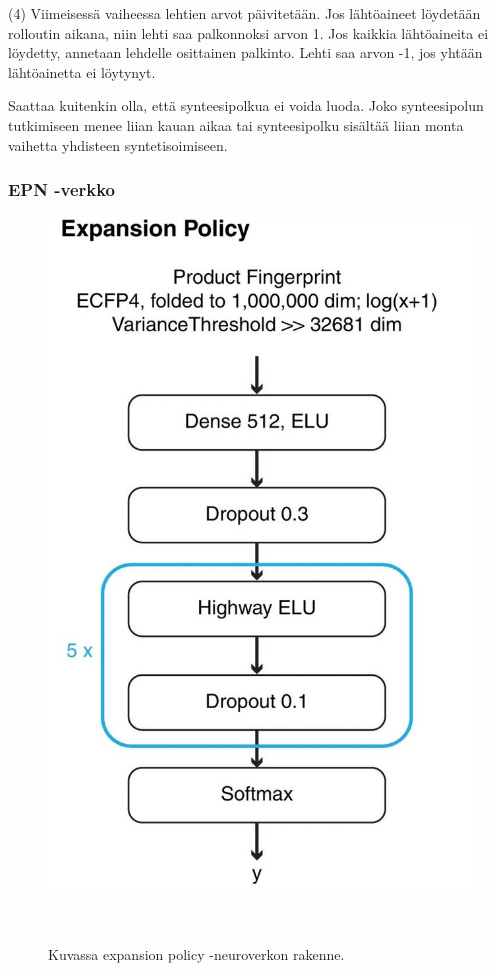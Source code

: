 \documentclass[finnish,twoside,censored,tkt,sw-line]{HYthesisML}
\begin{document}
(4) Viimeisessä vaiheessa lehtien arvot päivitetään.
Jos lähtöaineet löydetään rolloutin aikana, niin lehti saa palkonnoksi arvon 1.
Jos kaikkia lähtöaineita ei löydetty, annetaan lehdelle osittainen palkinto.
Lehti saa arvon -1, jos yhtään lähtöainetta ei löytynyt.

Saattaa kuitenkin olla, että synteesipolkua ei voida luoda.
Joko synteesipolun tutkimiseen menee liian kauan aikaa tai synteesipolku sisältää liian monta vaihetta yhdisteen syntetisoimiseen.


\subsubsection{EPN -verkko}

\begin{figure}[!ht]
    \centering
    \includegraphics[]{expansion-policy.jpg}
    \caption{Kuvassa expansion policy -neuroverkon rakenne.}
    {~\cite{SeglerMarwinHS2018Pcsw}}
    \label{fig:3n-mcts-epn}
\end{figure}
\end{document}
